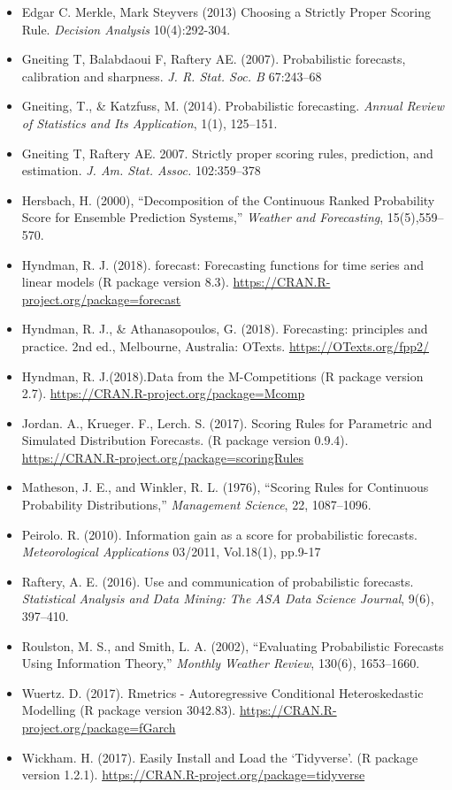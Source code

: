 \documentclass{monashthesis}
\theoremstyle{definition}
\theoremstyle{definition}
\theoremstyle{definition}
\theoremstyle{remark}
\begin{document}
\begin{itemize}
\item
  Edgar C. Merkle, Mark Steyvers (2013) Choosing a Strictly Proper
  Scoring Rule. \emph{Decision Analysis} 10(4):292-304.
\item
  Gneiting T, Balabdaoui F, Raftery AE. (2007). Probabilistic forecasts,
  calibration and sharpness. \emph{J. R. Stat. Soc. B} 67:243--68
\item
  Gneiting, T., \& Katzfuss, M. (2014). Probabilistic forecasting.
  \emph{Annual Review of Statistics and Its Application}, 1(1),
  125--151.
\item
  Gneiting T, Raftery AE. 2007. Strictly proper scoring rules,
  prediction, and estimation. \emph{J. Am. Stat. Assoc.} 102:359--378
\item
  Hersbach, H. (2000), ``Decomposition of the Continuous Ranked
  Probability Score for Ensemble Prediction Systems,'' \emph{Weather and
  Forecasting}, 15(5),559--570.
\item
  Hyndman, R. J. (2018). forecast: Forecasting functions for time series
  and linear models (R package version 8.3).
  \url{https://CRAN.R-project.org/package=forecast}
\item
  Hyndman, R. J., \& Athanasopoulos, G. (2018). Forecasting: principles
  and practice. 2nd ed., Melbourne, Australia: OTexts.
  \url{https://OTexts.org/fpp2/}
\item
  Hyndman, R. J.(2018).Data from the M-Competitions (R package version
  2.7). \url{https://CRAN.R-project.org/package=Mcomp}
\item
  Jordan. A., Krueger. F., Lerch. S. (2017). Scoring Rules for
  Parametric and Simulated Distribution Forecasts. (R package version
  0.9.4). \url{https://CRAN.R-project.org/package=scoringRules}
\item
  Matheson, J. E., and Winkler, R. L. (1976), ``Scoring Rules for
  Continuous Probability Distributions,'' \emph{Management Science}, 22,
  1087--1096.
\item
  Peirolo. R. (2010). Information gain as a score for probabilistic
  forecasts. \emph{Meteorological Applications} 03/2011, Vol.18(1),
  pp.9-17
\item
  Raftery, A. E. (2016). Use and communication of probabilistic
  forecasts. \emph{Statistical Analysis and Data Mining: The ASA Data
  Science Journal}, 9(6), 397--410.
\item
  Roulston, M. S., and Smith, L. A. (2002), ``Evaluating Probabilistic
  Forecasts Using Information Theory,'' \emph{Monthly Weather Review},
  130(6), 1653--1660.
\item
  Wuertz. D. (2017). Rmetrics - Autoregressive Conditional
  Heteroskedastic Modelling (R package version 3042.83).
  \url{https://CRAN.R-project.org/package=fGarch}
\item
  Wickham. H. (2017). Easily Install and Load the `Tidyverse'. (R
  package version 1.2.1).
  \url{https://CRAN.R-project.org/package=tidyverse}
\end{itemize}

\printbibliography[heading=bibintoc]
\end{document}
